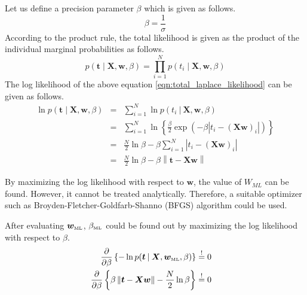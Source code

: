 \documentclass[11pt]{article}
\newcommand{\mle}[1]{{#1}_{\text{\tiny ML}}}
\newcommand\given[1][]{\:#1\vert\:}
\newcommand{\norm}[1]{\left\lVert#1\right\rVert}
\begin{document}
Let us define a precision parameter $\beta$ which is given as follows.
\begin{equation}
    \beta = \frac{1}{\sigma}
\end{equation}
According to the product rule, the total likelihood is given as the product of the individual marginal probabilities as follows.
\begin{equation}\label{eqn:total_laplace_likelihood}
    p(\bm{t} \mid \bm{X}, \bm{w}, \beta) = \prod_{i=1}^Np(t_i \mid \bm{X}, \bm{w}, \beta)
\end{equation}
The log likelihood of the above equation \ref{eqn:total_laplace_likelihood} can be given as follows.
\begin{eqnarray}
    \ln{p(\bm{t} \mid \bm{X}, \bm{w}, \beta)} 
    &=& 
    \sum_{i=1}^N \ln p(t_i \given \bm{X}, \bm{w}, \beta) \\
    &=&
    \sum_{i=1}^N \ln{\left\{\frac{\beta}{2}\exp{\left(-\beta \left\lvert t_i - (\bm{X w})_i \right\lvert \right)}\right\}} \\
    &=&
    \frac{N}{2}\ln{\beta} - \beta \sum_{i=1}^N \left\lvert t_i - (\bm{X w})_i \right\lvert \\
    &=&
    \frac{N}{2}\ln{\beta} - \beta \norm{\bm{t} - \bm{X w}}
\end{eqnarray}

By maximizing the log likelihood with respect to $\bm{w}$, the value of $W_{ML}$ can be found. However, it cannot be treated analytically. Therefore, a suitable optimizer such as Broyden-Fletcher-Goldfarb-Shanno (BFGS) algorithm could be used. 

After evaluating $\mle{\bm{w}}$, $\mle{\beta}$ could be found out by maximizing the log likelihood with respect to $\beta$. 
\begin{eqnarray}
    \frac{\partial }{\partial  \beta} \left\{ -\ln{p(\bm{t} \given \bm{X}, \mle{\bm{w}}, \beta)} \right\} 
    &\overset{!}{=} 0& \\
    \frac{\partial }{\partial  \beta} \left\{\beta \norm{\bm{t} - \bm{X w}} - \frac{N}{2}\ln{\beta} \right\}
    &\overset{!}{=} 0&
\end{eqnarray}
\end{document}
